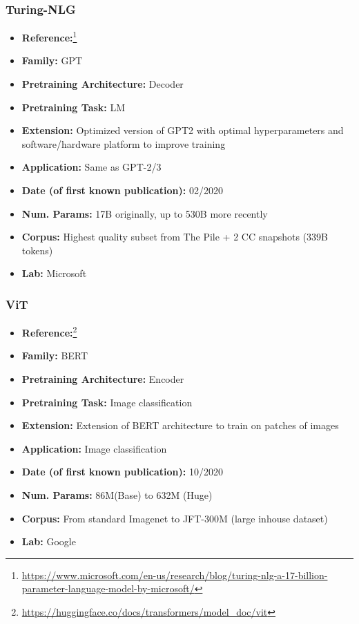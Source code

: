 \documentclass{article}
\begin{document}
\subsubsection{Turing-NLG}

            \begin{itemize}
                \item \textbf{Reference:}\footnote{\url{https://www.microsoft.com/en-us/research/blog/turing-nlg-a-17-billion-parameter-language-model-by-microsoft/}}\cite{rosset2020turing}
                \item \textbf{Family:} GPT
                \item \textbf{Pretraining Architecture:} Decoder
                \item \textbf{Pretraining Task:} LM
                \item \textbf{Extension:} Optimized version of GPT2 with optimal hyperparameters and software/hardware platform to improve training
                \item \textbf{Application:} Same as GPT-2/3
                \item \textbf{Date (of first known publication):} 02/2020
                \item \textbf{Num. Params:} 17B originally, up to 530B more recently
                \item \textbf{Corpus:} Highest quality subset from The Pile + 2 CC snapshots (339B tokens)
                \item \textbf{Lab:} Microsoft
            \end{itemize}
 
\subsubsection{ViT}

            \begin{itemize}
                 \item \textbf{Reference:}\footnote{\url{https://huggingface.co/docs/transformers/model_doc/vit}}\cite{dosovitskiy2020image}
                 \item \textbf{Family:} BERT
                \item \textbf{Pretraining Architecture:} Encoder
                \item \textbf{Pretraining Task:} Image classification
                \item \textbf{Extension:} Extension of BERT architecture to train on patches of images
                \item \textbf{Application:} Image classification
                \item \textbf{Date (of first known publication):} 10/2020
                \item \textbf{Num. Params:} 86M(Base) to 632M (Huge)
                \item \textbf{Corpus:} From standard Imagenet to JFT-300M (large inhouse dataset)
                \item \textbf{Lab:} Google
            \end{itemize}
\end{document}
